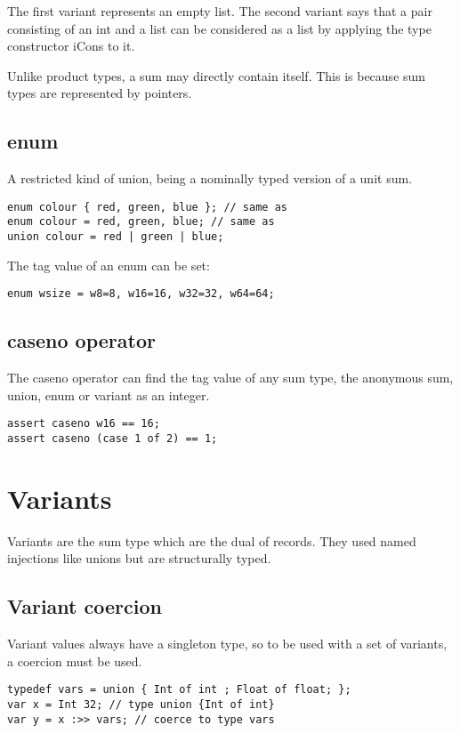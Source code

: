 \documentclass[oneside]{book}
\begin{document}
The first variant represents an empty list. The second variant
says that a pair consisting of an int and a list can be considered
as a list by applying the type constructor iCons to it.

Unlike product types, a sum may directly contain itself.
This is because sum types are represented by pointers.

\subsection{enum}
A restricted kind of union, being a nominally typed version
of a unit sum.

\begin{verbatim}
enum colour { red, green, blue }; // same as
enum colour = red, green, blue; // same as
union colour = red | green | blue;
\end{verbatim}


The tag value of an enum can be set:

\begin{verbatim}
enum wsize = w8=8, w16=16, w32=32, w64=64;
\end{verbatim}


\subsection{caseno operator}
The caseno operator can find the tag value of any sum type,
the anonymous sum, union, enum or variant as an integer.

\begin{verbatim}
assert caseno w16 == 16;
assert caseno (case 1 of 2) == 1;
\end{verbatim}


\section{Variants}
Variants are the sum type which are the dual of records.
They used named injections like unions but are structurally typed.


\subsection{Variant coercion}
Variant values always have a singleton type, so to be used
with a set of variants, a coercion must be used.

\begin{verbatim}
typedef vars = union { Int of int ; Float of float; };
var x = Int 32; // type union {Int of int}
var y = x :>> vars; // coerce to type vars
\end{verbatim}
\end{document}
